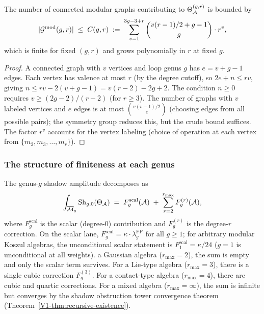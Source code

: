 \begin{proposition}
\label{prop:thqg-I-graph-count}
The number of connected modular graphs contributing to $\Theta_{\mathcal{A}}^{(g,r)}$ is bounded by
\begin{equation}%
|\Gmod(g,r)| \;\leq\; C(g,r) \;:=\; \sum_{v=1}^{3g-3+r} \binom{v(r-1)/2 + g - 1}{g} \cdot r^v,
\end{equation}
which is finite for fixed $(g,r)$ and grows polynomially in $r$ at fixed $g$.
\end{proposition}

\begin{proof}
A connected graph with $v$ vertices and loop genus $g$ has $e = v + g - 1$ edges. Each vertex has valence at most $r$ (by the degree cutoff), so $2e + n \leq rv$, giving $n \leq rv - 2(v+g-1) = v(r-2) - 2g + 2$. The condition $n \geq 0$ requires $v \geq (2g-2)/(r-2)$ (for $r \geq 3$). The number of graphs with $v$ labeled vertices and $e$ edges is at most $\binom{v(v-1)/2}{e}$ (choosing edges from all possible pairs); the symmetry group reduces this, but the crude bound suffices. The factor $r^v$ accounts for the vertex labeling (choice of operation at each vertex from $\{m_2, m_3, \ldots, m_r\}$).
\end{proof}

\subsubsection{The structure of finiteness at each genus}

\begin{proposition}
The genus-$g$ shadow amplitude decomposes as
\begin{equation}%
\int_{\overline{\mathcal{M}}_g} \operatorname{Sh}_{g,0}(\Theta_\cA) \;=\; F_g^{\mathrm{scal}}(\cA) \;+\; \sum_{r=2}^{r_{\max}} F_g^{(r)}(\cA),
\end{equation}
where $F_g^{\mathrm{scal}}$ is the scalar (degree-$0$) contribution and
$F_g^{(r)}$ is the degree-$r$ correction. On the scalar
lane, $F_g^{\mathrm{scal}} = \kappa \cdot \lambda_g^{\mathrm{FP}}$ for
all $g \geq 1$; for arbitrary modular Koszul algebras, the
unconditional scalar statement is $F_1^{\mathrm{scal}}=\kappa/24$
\textup{(}$g = 1$ is unconditional at all weights\textup{)}. %
a Gaussian algebra ($r_{\max} = 2$), the sum is empty and only the
scalar term survives. For a Lie-type algebra ($r_{\max} = 3$), there
is a single cubic correction $F_g^{(3)}$. For a contact-type algebra
($r_{\max} = 4$), there are cubic and quartic corrections. For a mixed
algebra ($r_{\max} = \infty$), the sum is infinite but converges by the
shadow obstruction tower convergence theorem (Theorem~\ref{V1-thm:recursive-existence}).
\end{proposition}

